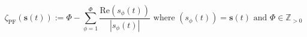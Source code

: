 \begin{equation}
	\zeta_\text{PF}(\textbf{s}(t)):= \Phi - \sum_{\phi=1}^{\Phi}\frac{\text{Re}(s_\phi(t))}{|s_\phi(t)|}  \text{ where } (s_\phi(t)) = \textbf{s}(t) \text{ and } \Phi \in \mathbb{Z}_{>0}
\label{ch1:equ:power-factor}
\end{equation}